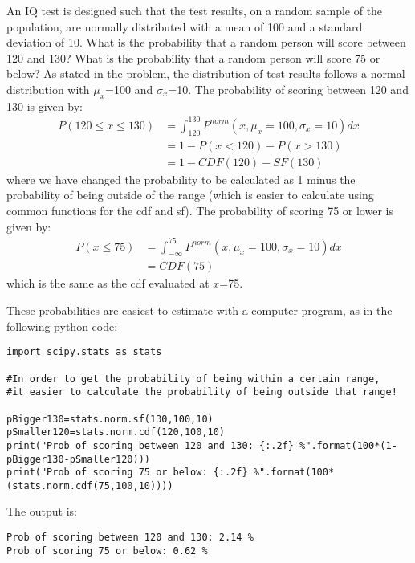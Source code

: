 \clearpage
\begin{example}{}{An IQ test is designed such that the test results, on a random sample of the population, are normally distributed with a mean of 100 and a standard deviation of 10. What is the probability that a random person will score between 120 and 130? What is the probability that a random person will score 75 or below?}{}
As stated in the problem, the distribution of test results follows a normal distribution with $\mu_x$=100 and $\sigma_x$=10. The probability of scoring between 120 and 130 is given by:
\begin{align*}
P(120 \leq x \leq 130)&=\int_{120}^{130}P^{norm}(x,\mu_x=100,\sigma_x=10)dx\\
&=1-P(x < 120)-P(x > 130)\\
&=1-CDF(120)-SF(130)
\end{align*}
where we have changed the probability to be calculated as 1 minus the probability of being outside of the range (which is easier to calculate using common functions for the cdf and sf). The probability of scoring 75 or lower is given by:
\begin{align*}
P(x \leq 75)&=\int_{-\infty}^{75}P^{norm}(x,\mu_x=100,\sigma_x=10)dx\\
&=CDF(75)
\end{align*}
which is the same as the cdf evaluated at $x$=75. 

These probabilities are easiest to estimate with a computer program, as in the following python code:
\begin{lstlisting}[frame=single] 
import scipy.stats as stats

#In order to get the probability of being within a certain range,
#it easier to calculate the probability of being outside that range!

pBigger130=stats.norm.sf(130,100,10)
pSmaller120=stats.norm.cdf(120,100,10)
print("Prob of scoring between 120 and 130: {:.2f} %".format(100*(1-pBigger130-pSmaller120)))
print("Prob of scoring 75 or below: {:.2f} %".format(100*(stats.norm.cdf(75,100,10))))
\end{lstlisting}
The output is:
\begin{verbatim}
Prob of scoring between 120 and 130: 2.14 %
Prob of scoring 75 or below: 0.62 %
\end{verbatim}
\end{example}

